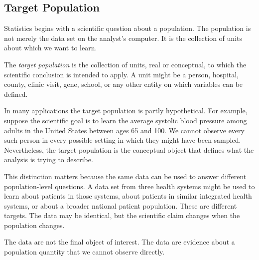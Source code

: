 \label{lec:1-1}

\subsection{Target Population}

Statistics begins with a scientific question about a population. The population is not merely the data set on the analyst's computer. It is the collection of units about which we want to learn.

\begin{definition}
The \emph{target population} is the collection of units, real or conceptual, to which the scientific conclusion is intended to apply. A unit might be a person, hospital, county, clinic visit, gene, school, or any other entity on which variables can be defined.
\end{definition}

In many applications the target population is partly hypothetical. For example, suppose the scientific goal is to learn the average systolic blood pressure among adults in the United States between ages 65 and 100. We cannot observe every such person in every possible setting in which they might have been sampled. Nevertheless, the target population is the conceptual object that defines what the analysis is trying to describe.

This distinction matters because the same data can be used to answer different population-level questions. A data set from three health systems might be used to learn about patients in those systems, about patients in similar integrated health systems, or about a broader national patient population. These are different targets. The data may be identical, but the scientific claim changes when the population changes.

\begin{keyidea}
The data are not the final object of interest. The data are evidence about a population quantity that we cannot observe directly.
\end{keyidea}

